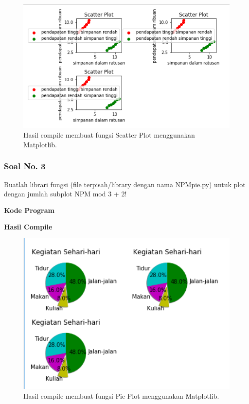 \begin{figure}[H]
	\includegraphics[width=12cm]{figures/6/1154016/praktek/p2.png}
	\centering
	\caption{Hasil compile membuat fungsi Scatter Plot menggunakan Matplotlib.}
\end{figure}

\subsubsection{Soal No. 3}
\hfill \break
Buatlah librari fungsi (file terpisah/library dengan nama NPMpie.py) untuk plot dengan jumlah subplot NPM mod 3 + 2!

\hfill \break
\textbf{Kode Program}



\hfill \break
\textbf{Hasil Compile}

\begin{figure}[H]
	\includegraphics[width=12cm]{figures/6/1154016/praktek/p3.png}
	\centering
	\caption{Hasil compile membuat fungsi Pie Plot menggunakan Matplotlib.}
\end{figure}

